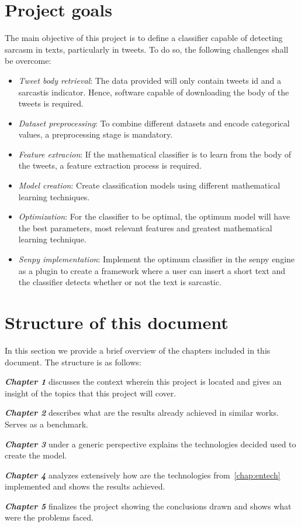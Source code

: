 \section{Project goals}
The main objective of this project is to define a classifier capable of detecting sarcasm in texts, particularly in tweets. To do so, the following challenges shall be overcome:

\begin{itemize}

\item  \textit{Tweet body retrieval}: The data provided will only contain tweets id and a sarcastis indicator. Hence, software capable of downloading the body of the tweets is required.
\item \textit{Dataset preprocessing}: To combine different datasets and encode categorical values, a preprocessing stage is mandatory.
\item \textit{Feature extracion}: If the mathematical classifier is to learn from the body of the tweets, a feature extraction process is required.
\item \textit{Model creation}: Create classification models using different mathematical learning techniques.
\item \textit{Optimization}: For the classifier to be optimal, the optimum model will have the best parameters, most relevant features and greatest mathematical learning technique.
\item \textit{Senpy implementation}: Implement the optimum classifier in the senpy engine as a plugin to create a framework where a user can insert a short text and the classifier detects whether or not the text is sarcastic.

\end{itemize}

\section{Structure of this document}
In this section we provide a brief overview of the chapters included in this document. The structure is as follows:

\textbf{\textit{Chapter 1}} discusses the context wherein this project is located and gives an insight of the topics that this project will cover.

\textbf{\textit{Chapter 2}} describes what are the results already achieved in similar works. Serves as a benchmark.

\textbf{\textit{Chapter 3}} under a generic perspective explains the technologies decided used to create the model.

\textbf{\textit{Chapter 4}} analyzes extensively how are the technologies from~\cref{chap:entech} implemented and shows the results achieved.

\textbf{\textit{Chapter 5}} finalizes the project showing the conclusions drawn and shows what were the problems faced.
